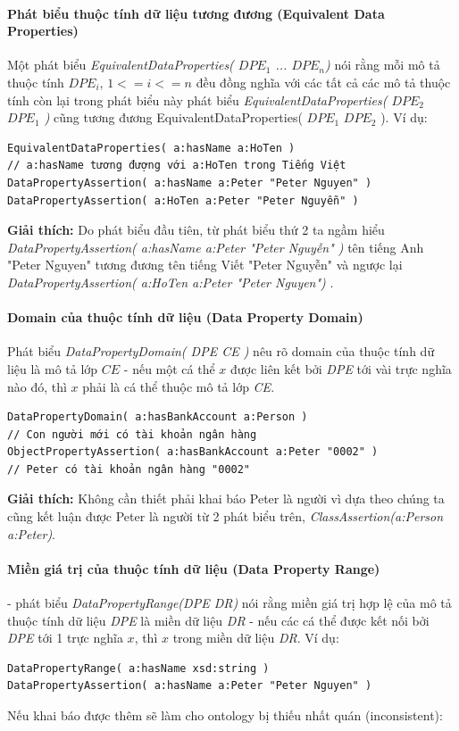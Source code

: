 \paragraph{Phát biểu thuộc tính dữ liệu tương đương (Equivalent Data Properties)} Một phát biểu \textit{EquivalentDataProperties( $DPE_{1}$ ... $DPE_{n}$)} nói rằng mỗi mô tả thuộc tính $DPE_{i}$, $1<=i<=n$ đều đồng nghĩa với các tất cả các mô tả thuộc tính còn lại trong phát biểu này phát biểu \textit{EquivalentDataProperties( $DPE_{2}$ $DPE_{1}$ )} cũng tương đương EquivalentDataProperties( $DPE_{1}$ $DPE_{2}$ ). Ví dụ:
\begin{verbatim}
EquivalentDataProperties( a:hasName a:HoTen ) 
// a:hasName tương đượng với a:HoTen trong Tiếng Việt
DataPropertyAssertion( a:hasName a:Peter "Peter Nguyen" )
DataPropertyAssertion( a:HoTen a:Peter "Peter Nguyễn" )
\end{verbatim}
\textbf{Giải thích:} Do phát biểu đầu tiên, từ phát biểu thứ 2 ta ngầm hiểu \textit{DataPropertyAssertion( a:hasName a:Peter "Peter Nguyễn" )} tên tiếng Anh "Peter Nguyen" tương đương tên tiếng Viết "Peter Nguyễn" và ngược lại \textit{DataPropertyAssertion( a:HoTen a:Peter "Peter Nguyen") }.


\paragraph{Domain của thuộc tính dữ liệu (Data Property Domain)} Phát biểu \textit{DataPropertyDomain( DPE CE )} nêu rõ domain của thuộc tính dữ liệu là mô tả lớp $CE$ -  nếu một cá thể $x$ được liên kết bởi \textit{DPE} tới vài trực nghĩa nào đó, thì $x$ phải là cá thể thuộc mô tả lớp \textit{CE}.
\begin{verbatim}
DataPropertyDomain( a:hasBankAccount a:Person ) 
// Con người mới có tài khoản ngân hàng
ObjectPropertyAssertion( a:hasBankAccount a:Peter "0002" ) 
// Peter có tài khoản ngân hàng "0002"
\end{verbatim}
\textbf{Giải thích:} Không cần thiết phải khai báo Peter là người vì dựa theo chúng ta cũng kết luận được Peter là người từ 2 phát biểu trên, \textit{ClassAssertion(a:Person a:Peter)}.


\paragraph{Miền giá trị của thuộc tính dữ liệu (Data Property Range)} - phát biểu \textit{DataPropertyRange(DPE DR)} nói rằng miền giá trị hợp lệ của mô tả thuộc tính dữ liệu \textit{DPE} là miền dữ liệu \textit{DR} - nếu các cá thể được kết nối bởi \textit{DPE} tới 1 trực nghĩa $x$, thì $x$ trong miền dữ liệu \textit{DR}. Ví dụ:
\begin{verbatim}
DataPropertyRange( a:hasName xsd:string )
DataPropertyAssertion( a:hasName a:Peter "Peter Nguyen" )
\end{verbatim}
Nếu khai báo được thêm sẽ làm cho ontology bị thiếu nhất quán (inconsistent):

